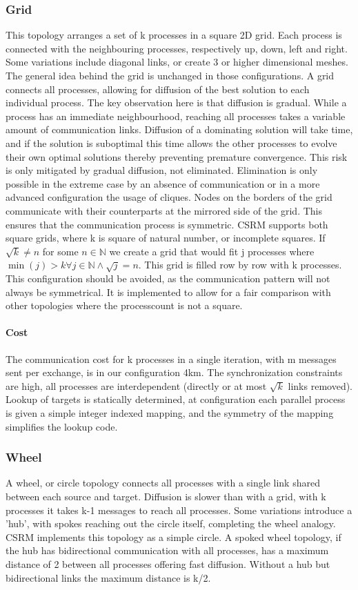 \subsubsection{Grid}
This topology arranges a set of k processes in a square 2D grid. Each process is connected with the neighbouring processes, respectively up, down, left and right. Some variations include diagonal links, or create 3 or higher dimensional meshes. The general idea behind the grid is unchanged in those configurations. 
A grid connects all processes, allowing for diffusion of the best solution to each individual process. The key observation here is that diffusion is gradual. While a process has an immediate neighbourhood, reaching all processes takes a variable amount of communication links. Diffusion of a dominating solution will take time, and if the solution is suboptimal this time allows the other processes to evolve their own optimal solutions thereby preventing premature convergence. This risk is only mitigated by gradual diffusion, not eliminated. Elimination is only possible in the extreme case by an absence of communication or in a more advanced configuration the usage of cliques. 
Nodes on the borders of the grid communicate with their counterparts at the mirrored side of the grid. This ensures that the communication process is symmetric. CSRM supports both square grids, where k is square of natural number, or incomplete squares. 
If $\sqrt{k} \neq n $ for some $n \in \mathbb{N}$ we create a grid that would fit j processes where $ \min(j) > k \forall j \in \mathbb{N} \land \sqrt{j} = n$. This grid is filled row by row with k processes. This configuration should be avoided, as the communication pattern will not always be symmetrical. It is implemented to allow for a fair comparison with other topologies where the processcount is not a square. 
\paragraph{Cost}
The communication cost for k processes in a single iteration, with m messages sent per exchange, is in our configuration 4km.
The synchronization constraints are high, all processes are interdependent (directly or at most $\sqrt{k}$ links removed).
Lookup of targets is statically determined, at configuration each parallel process is given a simple integer indexed mapping, and the symmetry of the mapping simplifies the lookup code.
\subsubsection{Wheel}
A wheel, or circle topology connects all processes with a single link shared between each source and target. Diffusion is slower than with a grid, with k processes it takes k-1 messages to reach all processes. Some variations introduce a 'hub', with spokes reaching out the circle itself, completing the wheel analogy. CSRM implements this topology as a simple circle. A spoked wheel topology, if the hub has bidirectional communication with all processes, has a maximum distance of 2 between all processes offering fast diffusion. Without a hub but bidirectional links the maximum distance is k/2.
